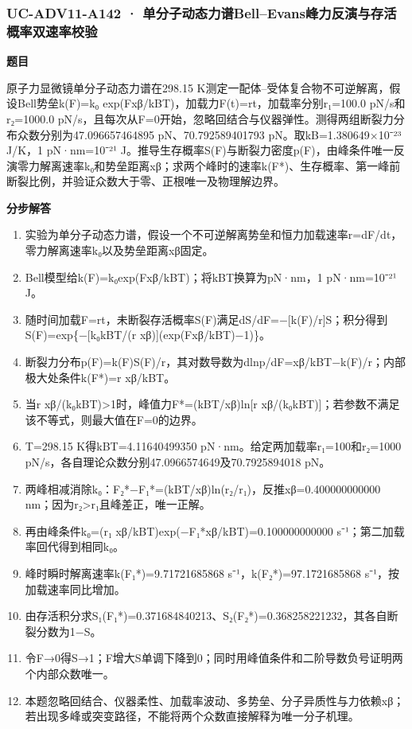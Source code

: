 \documentclass[UTF8,11pt,a4paper]{ctexart}
\begin{document}
\subsubsection*{UC-ADV11-A142 · 单分子动态力谱Bell–Evans峰力反演与存活概率双速率校验}
\noindent\textbf{题目}\par
原子力显微镜单分子动态力谱在298.15 K测定一配体–受体复合物不可逆解离，假设Bell势垒k(F)=k₀ exp(Fxβ/kBT)，加载力F(t)=rt，加载率分别r₁=100.0 pN/s和r₂=1000.0 pN/s，且每次从F=0开始，忽略回结合与仪器弹性。测得两组断裂力分布众数分别为47.096657464895 pN、70.792589401793 pN。取kB=1.380649×10⁻²³ J/K，1 pN·nm=10⁻²¹ J。推导生存概率S(F)与断裂力密度p(F)，由峰条件唯一反演零力解离速率k₀和势垒距离xβ；求两个峰时的速率k(F*)、生存概率、第一峰前断裂比例，并验证众数大于零、正根唯一及物理解边界。\par
\medskip\noindent\textbf{分步解答}
\begin{enumerate}
\item 实验为单分子动态力谱，假设一个不可逆解离势垒和恒力加载速率r=dF/dt，零力解离速率k₀以及势垒距离xβ固定。
\item Bell模型给k(F)=k₀exp(Fxβ/kBT)；将kBT换算为pN·nm，1 pN·nm=10⁻²¹ J。
\item 随时间加载F=rt，未断裂存活概率S(F)满足dS/dF=−[k(F)/r]S；积分得到S(F)=exp\{−[k₀kBT/(r xβ)](exp(Fxβ/kBT)−1)\}。
\item 断裂力分布p(F)=k(F)S(F)/r，其对数导数为dlnp/dF=xβ/kBT−k(F)/r；内部极大处条件k(F*)=r xβ/kBT。
\item 当r xβ/(k₀kBT)>1时，峰值力F*=(kBT/xβ)ln[r xβ/(k₀kBT)]；若参数不满足该不等式，则最大值在F=0的边界。
\item T=298.15 K得kBT=4.11640499350 pN·nm。给定两加载率r₁=100和r₂=1000 pN/s，各自理论众数分别47.0966574649及70.7925894018 pN。
\item 两峰相减消除k₀：F₂*−F₁*=(kBT/xβ)ln(r₂/r₁)，反推xβ=0.400000000000 nm；因为r₂>r₁且峰差正，唯一正解。
\item 再由峰条件k₀=(r₁ xβ/kBT)exp(−F₁*xβ/kBT)=0.100000000000 s⁻¹；第二加载率回代得到相同k₀。
\item 峰时瞬时解离速率k(F₁*)=9.71721685868 s⁻¹，k(F₂*)=97.1721685868 s⁻¹，按加载速率同比增加。
\item 由存活积分求S₁(F₁*)=0.371684840213、S₂(F₂*)=0.368258221232，其各自断裂分数为1−S。
\item 令F→0得S→1；F增大S单调下降到0；同时用峰值条件和二阶导数负号证明两个内部众数唯一。
\item 本题忽略回结合、仪器柔性、加载率波动、多势垒、分子异质性与力依赖xβ；若出现多峰或突变路径，不能将两个众数直接解释为唯一分子机理。
\end{enumerate}
\end{document}
